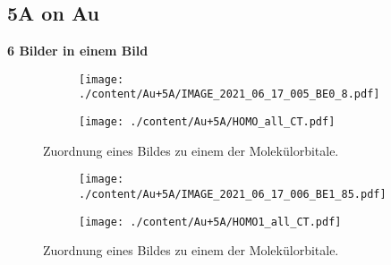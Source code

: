         \subsection{5A on Au}
        \textbf{6 Bilder in einem Bild}
            \begin{figure}
                \label{fig:MOT}
                \centering
                \begin{subfigure}{0.48\textwidth}
                    \centering
                    \texttt{[image: ./content/Au+5A/IMAGE\_2021\_06\_17\_005\_BE0\_8.pdf]}
                \end{subfigure}
                \begin{subfigure}{0.48\textwidth}
                    \centering
                    \texttt{[image: ./content/Au+5A/HOMO\_all\_CT.pdf]}
                \end{subfigure}
                \caption{Zuordnung eines Bildes zu einem der Molekülorbitale.}
            \end{figure}
            \begin{figure}
                \centering
                \begin{subfigure}{0.48\textwidth}
                    \centering
                    \texttt{[image: ./content/Au+5A/IMAGE\_2021\_06\_17\_006\_BE1\_85.pdf]}
                \end{subfigure}
                \begin{subfigure}{0.48\textwidth}
                    \centering
                    \texttt{[image: ./content/Au+5A/HOMO1\_all\_CT.pdf]}
                \end{subfigure}
                \caption{Zuordnung eines Bildes zu einem der Molekülorbitale.}
            \end{figure}
